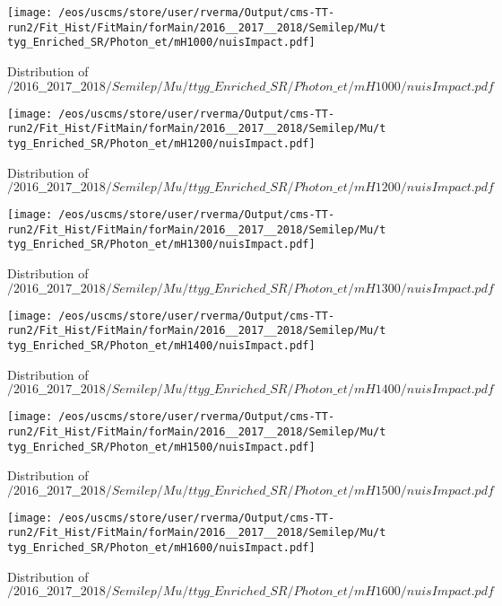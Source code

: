 \begin{figure}
\centering
\texttt{[image: /eos/uscms/store/user/rverma/Output/cms-TT-run2/Fit\_Hist/FitMain/forMain/2016\_\_2017\_\_2018/Semilep/Mu/ttyg\_Enriched\_SR/Photon\_et/mH1000/nuisImpact.pdf]}
\caption{Distribution of $/2016\_\_2017\_\_2018/Semilep/Mu/ttyg\_Enriched\_SR/Photon\_et/mH1000/nuisImpact.pdf$}
\end{figure}

\begin{figure}
\centering
\texttt{[image: /eos/uscms/store/user/rverma/Output/cms-TT-run2/Fit\_Hist/FitMain/forMain/2016\_\_2017\_\_2018/Semilep/Mu/ttyg\_Enriched\_SR/Photon\_et/mH1200/nuisImpact.pdf]}
\caption{Distribution of $/2016\_\_2017\_\_2018/Semilep/Mu/ttyg\_Enriched\_SR/Photon\_et/mH1200/nuisImpact.pdf$}
\end{figure}

\begin{figure}
\centering
\texttt{[image: /eos/uscms/store/user/rverma/Output/cms-TT-run2/Fit\_Hist/FitMain/forMain/2016\_\_2017\_\_2018/Semilep/Mu/ttyg\_Enriched\_SR/Photon\_et/mH1300/nuisImpact.pdf]}
\caption{Distribution of $/2016\_\_2017\_\_2018/Semilep/Mu/ttyg\_Enriched\_SR/Photon\_et/mH1300/nuisImpact.pdf$}
\end{figure}

\begin{figure}
\centering
\texttt{[image: /eos/uscms/store/user/rverma/Output/cms-TT-run2/Fit\_Hist/FitMain/forMain/2016\_\_2017\_\_2018/Semilep/Mu/ttyg\_Enriched\_SR/Photon\_et/mH1400/nuisImpact.pdf]}
\caption{Distribution of $/2016\_\_2017\_\_2018/Semilep/Mu/ttyg\_Enriched\_SR/Photon\_et/mH1400/nuisImpact.pdf$}
\end{figure}

\begin{figure}
\centering
\texttt{[image: /eos/uscms/store/user/rverma/Output/cms-TT-run2/Fit\_Hist/FitMain/forMain/2016\_\_2017\_\_2018/Semilep/Mu/ttyg\_Enriched\_SR/Photon\_et/mH1500/nuisImpact.pdf]}
\caption{Distribution of $/2016\_\_2017\_\_2018/Semilep/Mu/ttyg\_Enriched\_SR/Photon\_et/mH1500/nuisImpact.pdf$}
\end{figure}

\begin{figure}
\centering
\texttt{[image: /eos/uscms/store/user/rverma/Output/cms-TT-run2/Fit\_Hist/FitMain/forMain/2016\_\_2017\_\_2018/Semilep/Mu/ttyg\_Enriched\_SR/Photon\_et/mH1600/nuisImpact.pdf]}
\caption{Distribution of $/2016\_\_2017\_\_2018/Semilep/Mu/ttyg\_Enriched\_SR/Photon\_et/mH1600/nuisImpact.pdf$}
\end{figure}

